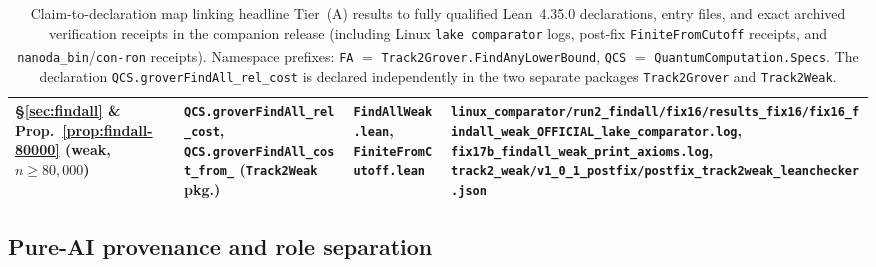 \documentclass[11pt,a4paper]{article}
\newcommand{\RA}{\raggedright\arraybackslash}
\theoremstyle{definition}
\theoremstyle{remark}
\begin{document}
\begin{table}[htbp]
\begin{tabular}{@{}>{\RA}p{2.9cm}>{\RA}p{5.2cm}>{\RA}p{3.1cm}>{\RA}p{3.9cm}@{}}
\addlinespace
\S\ref{sec:findall} \& Prop.~\ref{prop:findall-80000} (weak, \(n \ge 80{,}000\)) & \texttt{QCS.groverFindAll\_\allowbreak rel\_\allowbreak cost}, \texttt{QCS.grover\allowbreak FindAll\_\allowbreak cost\_\allowbreak from\_\allowbreak 80000} (\texttt{Track2Weak} pkg.) & \texttt{FindAll\allowbreak Weak.lean}, \texttt{Finite\allowbreak FromCutoff.lean} & \texttt{linux\_\allowbreak comparator/\allowbreak run2\_findall/\allowbreak fix16/\allowbreak results\_fix16/\allowbreak fix16\_findall\_\allowbreak weak\_\allowbreak OFFICIAL\_\allowbreak lake\_\allowbreak comparator.log}, \texttt{fix17b\_findall\_\allowbreak weak\_print\_\allowbreak axioms.log}, \texttt{track2\_weak/\allowbreak v1\_0\_1\_postfix/\allowbreak postfix\_track2weak\_\allowbreak leanchecker.json} \\
\bottomrule
\end{tabular}
\caption{Claim-to-declaration map linking headline Tier~(A) results to fully qualified Lean~4.35.0 declarations, entry files, and exact archived verification receipts in the companion release (including Linux \texttt{lake comparator} logs, post-fix \texttt{Finite\allowbreak FromCutoff} receipts, and \texttt{nanoda\_\allowbreak bin}/\texttt{con-ron} receipts). \textsuperscript{\dag}Namespace prefixes: \texttt{FA} \(=\) \texttt{Track2Grover.\allowbreak FindAny\allowbreak LowerBound}, \texttt{QCS} \(=\) \texttt{Quantum\allowbreak Computation.\allowbreak Specs}. The declaration \texttt{QCS.grover\allowbreak FindAll\_\allowbreak rel\_\allowbreak cost} is declared independently in the two separate packages \texttt{Track2\allowbreak Grover} and \texttt{Track2\allowbreak Weak}.}
\label{tab:claim-map}
\end{table}

\FloatBarrier
\subsection{Pure-AI provenance and role separation}
\end{document}
